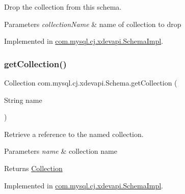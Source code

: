 Drop the collection from this schema.


\begin{DoxyParams}{Parameters}
{\em collection\+Name} & name of collection to drop \\
\hline
\end{DoxyParams}


Implemented in \mbox{\hyperlink{classcom_1_1mysql_1_1cj_1_1xdevapi_1_1_schema_impl_a8420b65714f543e4bd4a113edeadeb14}{com.\+mysql.\+cj.\+xdevapi.\+Schema\+Impl}}.

\mbox{\label{interfacecom_1_1mysql_1_1cj_1_1xdevapi_1_1_schema_aeb2f782db94fd4a068b1c1e6b9f3f20e}} 
\subsubsection{\texorpdfstring{get\+Collection()}{getCollection()}\hspace{0.1cm}{\footnotesize\ttfamily [1/2]}}
{\footnotesize\ttfamily Collection com.\+mysql.\+cj.\+xdevapi.\+Schema.\+get\+Collection (\begin{DoxyParamCaption}\item[{String}]{name }\end{DoxyParamCaption})}

Retrieve a reference to the named collection.


\begin{DoxyParams}{Parameters}
{\em name} & collection name \\
\hline
\end{DoxyParams}
\begin{DoxyReturn}{Returns}
\mbox{\hyperlink{interfacecom_1_1mysql_1_1cj_1_1xdevapi_1_1_collection}{Collection}} 
\end{DoxyReturn}


Implemented in \mbox{\hyperlink{classcom_1_1mysql_1_1cj_1_1xdevapi_1_1_schema_impl_abcdaa1e922b045e78ed4748279042ed9}{com.\+mysql.\+cj.\+xdevapi.\+Schema\+Impl}}.

\mbox{\label{interfacecom_1_1mysql_1_1cj_1_1xdevapi_1_1_schema_a6c7616f0106d2b05c75ed9e58238f0cf}} 
